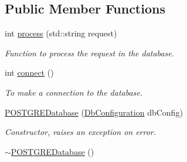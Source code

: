 \subsection*{Public Member Functions}
\begin{DoxyCompactItemize}
\item 
int \hyperlink{classPOSTGREDatabase_a0371d887a489418bed525acb0d9c5eb3}{process} (std::string request)
\begin{DoxyCompactList}\small\item\em Function to process the request in the database. \item\end{DoxyCompactList}\item 
int \hyperlink{classPOSTGREDatabase_a758b0d66ddda58296932242533000846}{connect} ()
\begin{DoxyCompactList}\small\item\em To make a connection to the database. \item\end{DoxyCompactList}\item 
\hypertarget{classPOSTGREDatabase_a6247c279cf30239d6685a71fdab706b9}{
\hyperlink{classPOSTGREDatabase_a6247c279cf30239d6685a71fdab706b9}{POSTGREDatabase} (\hyperlink{classDbConfiguration}{DbConfiguration} dbConfig)}
\label{classPOSTGREDatabase_a6247c279cf30239d6685a71fdab706b9}

\begin{DoxyCompactList}\small\item\em Constructor, raises an exception on error. \item\end{DoxyCompactList}\item 
\hypertarget{classPOSTGREDatabase_a455249ba891bb36b51ea2fb67f5043bf}{
\hyperlink{classPOSTGREDatabase_a455249ba891bb36b51ea2fb67f5043bf}{$\sim$POSTGREDatabase} ()}
\label{classPOSTGREDatabase_a455249ba891bb36b51ea2fb67f5043bf}


\end{DoxyCompactItemize}
